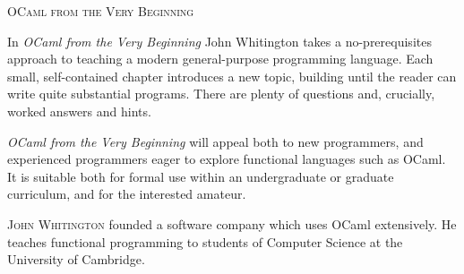 \documentclass[]{book}
\begin{document}

%
%
%
%


%


\thispagestyle{empty}

{\Large\scshape OCaml from the Very Beginning}

\vspace{16mm}

\setlength{\parindent}{25pt}
\noindent In \textit{OCaml from the Very Beginning} John Whitington takes a no-prerequisites approach to teaching a modern general-purpose programming language. Each small, self-contained chapter introduces a new topic, building until the reader can write quite substantial programs. There are plenty of questions and, crucially, worked answers and hints.

\textit{OCaml from the Very Beginning} will appeal both to new programmers, and experienced programmers eager to explore functional languages such as OCaml. It is suitable both for formal use within an undergraduate or graduate curriculum, and for the interested amateur.

\vspace{8mm}

\noindent\textsc{John Whitington} founded a software company which uses OCaml extensively. He teaches functional programming to students of Computer Science at the University of Cambridge.
\end{document}
